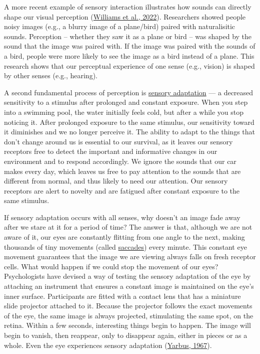 \documentclass[
]{krantz}
\begin{document}
A more recent example of sensory interaction illustrates how sounds can directly shape our visual perception (\protect\hyperlink{ref-Williams2022}{Williams et al., 2022}). Researchers showed people noisy images (e.g., a blurry image of a plane/bird) paired with naturalisitic sounds. Perception -- whether they saw it as a plane or bird -- was shaped by the sound that the image was paired with. If the image was paired with the sounds of a bird, people were more likely to see the image as a bird instead of a plane. This research shows that our perceptual experience of one sense (e.g., vision) is shaped by other senses (e.g., hearing).

A second fundamental process of perception is \protect\hyperlink{sensory-adaptation}{sensory adaptation} --- a decreased sensitivity to a stimulus after prolonged and constant exposure. When you step into a swimming pool, the water initially feels cold, but after a while you stop noticing it. After prolonged exposure to the same stimulus, our sensitivity toward it diminishes and we no longer perceive it. The ability to adapt to the things that don't change around us is essential to our survival, as it leaves our sensory receptors free to detect the important and informative changes in our environment and to respond accordingly. We ignore the sounds that our car makes every day, which leaves us free to pay attention to the sounds that are different from normal, and thus likely to need our attention. Our sensory receptors are alert to novelty and are fatigued after constant exposure to the same stimulus.

If sensory adaptation occurs with all senses, why doesn't an image fade away after we stare at it for a period of time? The answer is that, although we are not aware of it, our eyes are constantly flitting from one angle to the next, making thousands of tiny movements (called \protect\hyperlink{saccades}{saccades}) every minute. This constant eye movement guarantees that the image we are viewing always falls on fresh receptor cells. What would happen if we could stop the movement of our eyes? Psychologists have devised a way of testing the sensory adaptation of the eye by attaching an instrument that ensures a constant image is maintained on the eye's inner surface. Participants are fitted with a contact lens that has a miniature slide projector attached to it. Because the projector follows the exact movements of the eye, the same image is always projected, stimulating the same spot, on the retina. Within a few seconds, interesting things begin to happen. The image will begin to vanish, then reappear, only to disappear again, either in pieces or as a whole. Even the eye experiences sensory adaptation (\protect\hyperlink{ref-Yarbus1967}{Yarbus, 1967}).
\end{document}
